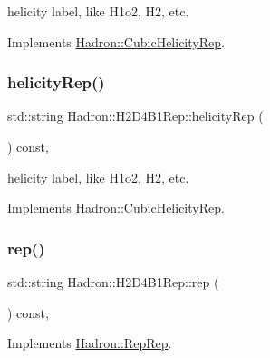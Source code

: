 helicity label, like H1o2, H2, etc. 

Implements \mbox{\hyperlink{structHadron_1_1CubicHelicityRep_af1096946b7470edf0a55451cc662f231}{Hadron\+::\+Cubic\+Helicity\+Rep}}.

\mbox{\label{structHadron_1_1H2D4B1Rep_a0d3def772b80e7f84ff2c62569ffa710}} 
\subsubsection{\texorpdfstring{helicityRep()}{helicityRep()}\hspace{0.1cm}{\footnotesize\ttfamily [2/2]}}
{\footnotesize\ttfamily std\+::string Hadron\+::\+H2\+D4\+B1\+Rep\+::helicity\+Rep (\begin{DoxyParamCaption}{ }\end{DoxyParamCaption}) const\hspace{0.3cm}{\ttfamily [inline]}, {\ttfamily [virtual]}}

helicity label, like H1o2, H2, etc. 

Implements \mbox{\hyperlink{structHadron_1_1CubicHelicityRep_af1096946b7470edf0a55451cc662f231}{Hadron\+::\+Cubic\+Helicity\+Rep}}.

\mbox{\label{structHadron_1_1H2D4B1Rep_a4f33e88c9985a78b47926b04736e7971}} 
\subsubsection{\texorpdfstring{rep()}{rep()}\hspace{0.1cm}{\footnotesize\ttfamily [1/3]}}
{\footnotesize\ttfamily std\+::string Hadron\+::\+H2\+D4\+B1\+Rep\+::rep (\begin{DoxyParamCaption}{ }\end{DoxyParamCaption}) const\hspace{0.3cm}{\ttfamily [inline]}, {\ttfamily [virtual]}}



Implements \mbox{\hyperlink{structHadron_1_1RepRep_ab3213025f6de249f7095892109575fde}{Hadron\+::\+Rep\+Rep}}.

\mbox{\label{structHadron_1_1H2D4B1Rep_a4f33e88c9985a78b47926b04736e7971}} 

